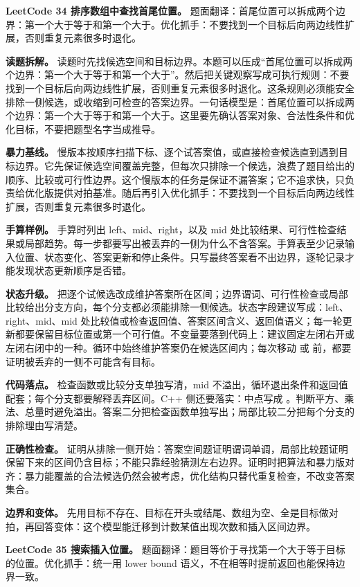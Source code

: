 \noindent\textbf{LeetCode 34 排序数组中查找首尾位置。} 题面翻译：首尾位置可以拆成两个边界：第一个大于等于和第一个大于。优化抓手：不要找到一个目标后向两边线性扩展，否则重复元素很多时退化。

\textbf{读题拆解。} 读题时先找候选空间和目标边界。本题可以压成“首尾位置可以拆成两个边界：第一个大于等于和第一个大于”。然后把关键观察写成可执行规则：不要找到一个目标后向两边线性扩展，否则重复元素很多时退化。这条规则必须能安全排除一侧候选，或收缩到可检查的答案边界。一句话模型是：首尾位置可以拆成两个边界：第一个大于等于和第一个大于。这里要先确认答案对象、合法性条件和优化目标，不要把题型名字当成推导。

\textbf{暴力基线。} 慢版本按顺序扫描下标、逐个试答案值，或直接检查候选直到遇到目标边界。它先保证候选空间覆盖完整，但每次只排除一个候选，浪费了题目给出的顺序、比较或可行性边界。这个慢版本的任务是保证不漏答案；它不追求快，只负责给优化版提供对拍基准。随后再引入优化抓手：不要找到一个目标后向两边线性扩展，否则重复元素很多时退化。

\textbf{手算样例。} 手算时列出 left、mid、right，以及 mid 处比较结果、可行性检查结果或局部趋势。每一步都要写出被丢弃的一侧为什么不含答案。手算表至少记录输入位置、状态变化、答案更新和停止条件。只写最终答案看不出边界，逐轮记录才能发现状态更新顺序是否错。

\textbf{状态升级。} 把逐个试候选改成维护答案所在区间；边界谓词、可行性检查或局部比较给出分支方向，每个分支都必须能排除一侧候选。状态字段建议写成：left、right、mid、mid 处比较值或检查返回值、答案区间含义、返回值语义；每一轮更新都要保留目标位置或第一个可行值。不变量要落到代码上：建议固定左闭右开或左闭右闭中的一种。循环中始终维护答案仍在候选区间内；每次移动  或  前，都要证明被丢弃的一侧不可能含有目标。

\textbf{代码落点。} 检查函数或比较分支单独写清，mid 不溢出，循环退出条件和返回值配套；每个分支都要解释丢弃区间。C++ 侧还要落实：中点写成 。判断平方、乘法、总量时避免溢出。答案二分把检查函数单独写出；局部比较二分把每个分支的排除理由写清楚。

\textbf{正确性检查。} 证明从排除一侧开始：答案空间题证明谓词单调，局部比较题证明保留下来的区间仍含目标；不能只靠经验猜测左右边界。证明时把算法和暴力版对齐：暴力能覆盖的合法候选仍然会被考虑，优化结构只替代重复检查，不改变答案集合。

\textbf{边界和变体。} 先用目标不存在、目标在开头或结尾、数组为空、全是目标做对拍，再回答变体：这个模型能迁移到计数某值出现次数和插入区间边界。

\noindent\textbf{LeetCode 35 搜索插入位置。} 题面翻译：题目等价于寻找第一个大于等于目标的位置。优化抓手：统一用 lower bound 语义，不在相等时提前返回也能保持边界一致。

